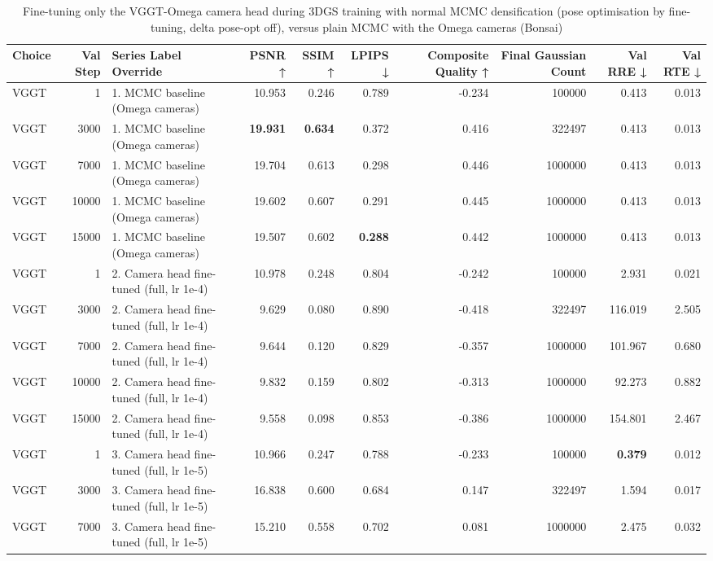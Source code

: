 \begin{table}[H]
\caption{\ifdefined\customcaption \customcaption \else Fine-tuning only the VGGT-Omega camera head during 3DGS training with normal MCMC densification (pose optimisation by fine-tuning, delta pose-opt off), versus plain MCMC with the Omega cameras (Bonsai) \fi}
\label{tab:101_omega_camera_finetune_bonsai}
\centering
\tiny
\begin{tabular}{lrlrrrrrrr}
\toprule
Choice & Val Step & Series Label Override & PSNR ↑ & SSIM ↑ & LPIPS ↓ & Composite Quality ↑ & Final Gaussian Count & Val RRE ↓ & Val RTE ↓ \\
\midrule
VGGT & 1 & 1. MCMC baseline (Omega cameras) & 10.953 & 0.246 & 0.789 & -0.234 & 100000 & 0.413 & 0.013 \\
VGGT & 3000 & 1. MCMC baseline (Omega cameras) & \textbf{19.931} & \textbf{0.634} & 0.372 & 0.416 & 322497 & 0.413 & 0.013 \\
VGGT & 7000 & 1. MCMC baseline (Omega cameras) & 19.704 & 0.613 & 0.298 & 0.446 & 1000000 & 0.413 & 0.013 \\
VGGT & 10000 & 1. MCMC baseline (Omega cameras) & 19.602 & 0.607 & 0.291 & 0.445 & 1000000 & 0.413 & 0.013 \\
VGGT & 15000 & 1. MCMC baseline (Omega cameras) & 19.507 & 0.602 & \textbf{0.288} & 0.442 & 1000000 & 0.413 & 0.013 \\
VGGT & 1 & 2. Camera head fine-tuned (full, lr 1e-4) & 10.978 & 0.248 & 0.804 & -0.242 & 100000 & 2.931 & 0.021 \\
VGGT & 3000 & 2. Camera head fine-tuned (full, lr 1e-4) & 9.629 & 0.080 & 0.890 & -0.418 & 322497 & 116.019 & 2.505 \\
VGGT & 7000 & 2. Camera head fine-tuned (full, lr 1e-4) & 9.644 & 0.120 & 0.829 & -0.357 & 1000000 & 101.967 & 0.680 \\
VGGT & 10000 & 2. Camera head fine-tuned (full, lr 1e-4) & 9.832 & 0.159 & 0.802 & -0.313 & 1000000 & 92.273 & 0.882 \\
VGGT & 15000 & 2. Camera head fine-tuned (full, lr 1e-4) & 9.558 & 0.098 & 0.853 & -0.386 & 1000000 & 154.801 & 2.467 \\
VGGT & 1 & 3. Camera head fine-tuned (full, lr 1e-5) & 10.966 & 0.247 & 0.788 & -0.233 & 100000 & \textbf{0.379} & 0.012 \\
VGGT & 3000 & 3. Camera head fine-tuned (full, lr 1e-5) & 16.838 & 0.600 & 0.684 & 0.147 & 322497 & 1.594 & 0.017 \\
VGGT & 7000 & 3. Camera head fine-tuned (full, lr 1e-5) & 15.210 & 0.558 & 0.702 & 0.081 & 1000000 & 2.475 & 0.032 \\

\end{tabular}
\end{table}
